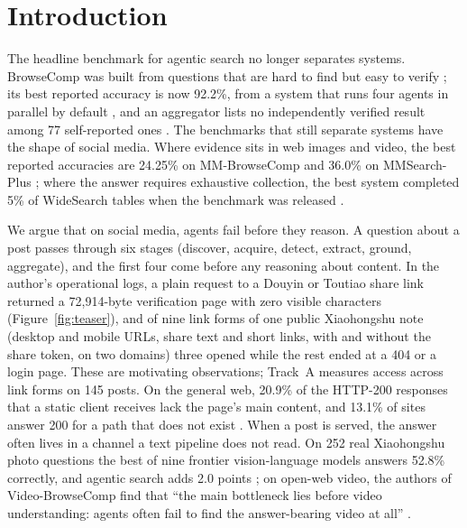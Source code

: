 \documentclass[11pt]{article}
\begin{document}
\section{Introduction}\label{sec:intro}

The headline benchmark for agentic search no longer separates systems. BrowseComp was built from questions
that are hard to find but easy to verify \citep{wei2025browsecomp}; its best reported accuracy is now 92.2\%,
from a system that runs four agents in parallel by default \citep{openai2026gpt56}, and an aggregator lists
no independently verified result among 77 self-reported ones \citep{llmstats2026browsecomp}. The
benchmarks that still separate systems have the shape of social media. Where evidence sits in web images
and video, the best reported accuracies are 24.25\% on MM-BrowseComp \citep{li2025mmbrowsecomp} and
36.0\% on MMSearch-Plus \citep{tao2025mmsearchplus}; where the answer requires exhaustive collection, the
best system completed 5\% of WideSearch tables when the benchmark was released \citep{wong2025widesearch}.

We argue that on social media, agents fail before they reason. A question about a post passes through six
stages (discover, acquire, detect, extract, ground, aggregate), and the first four come before any reasoning
about content. In the author's operational logs, a plain request to a Douyin or Toutiao share link returned
a 72{,}914-byte verification page with zero visible characters (Figure~\ref{fig:teaser}), and of nine link
forms of one public Xiaohongshu note (desktop and mobile URLs, share text and short links, with and without
the share token, on two domains) three opened while the rest ended at a 404 or a login page. These are
motivating observations; Track~A measures access across link forms on 145 posts. On the general
web, 20.9\% of the HTTP-200 responses that a static client receives lack the page's main content, and 13.1\%
of sites answer 200 for a path that does not exist \citep{zhang2026silent}. When a post is served, the
answer often lives in a channel a text pipeline does not read. On 252 real Xiaohongshu photo questions the
best of nine frontier vision-language models answers 52.8\% correctly, and agentic search adds 2.0
points \citep{jiang2026notevqa}; on open-web video, the authors of Video-BrowseComp find that ``the main
bottleneck lies before video understanding: agents often fail to find the answer-bearing video at all''
\citep{liang2025videobrowser}.
\end{document}
